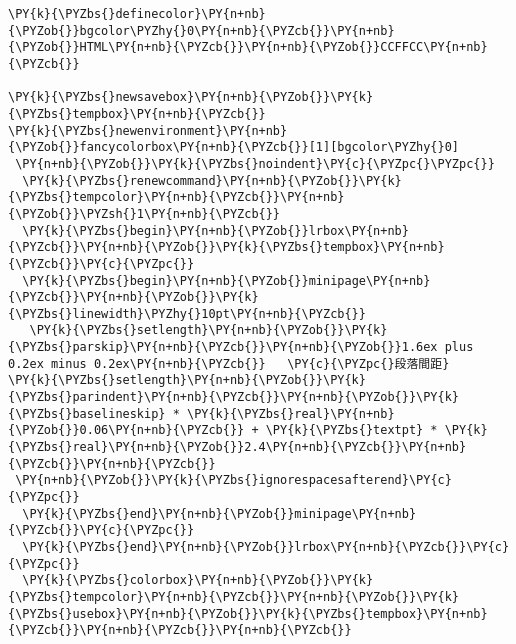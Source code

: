 \begin{Verbatim}[commandchars=\\\{\}]
\PY{k}{\PYZbs{}definecolor}\PY{n+nb}{\PYZob{}}bgcolor\PYZhy{}0\PY{n+nb}{\PYZcb{}}\PY{n+nb}{\PYZob{}}HTML\PY{n+nb}{\PYZcb{}}\PY{n+nb}{\PYZob{}}CCFFCC\PY{n+nb}{\PYZcb{}}

\PY{k}{\PYZbs{}newsavebox}\PY{n+nb}{\PYZob{}}\PY{k}{\PYZbs{}tempbox}\PY{n+nb}{\PYZcb{}}
\PY{k}{\PYZbs{}newenvironment}\PY{n+nb}{\PYZob{}}fancycolorbox\PY{n+nb}{\PYZcb{}}[1][bgcolor\PYZhy{}0]
 \PY{n+nb}{\PYZob{}}\PY{k}{\PYZbs{}noindent}\PY{c}{\PYZpc{}\PYZpc{}}
  \PY{k}{\PYZbs{}renewcommand}\PY{n+nb}{\PYZob{}}\PY{k}{\PYZbs{}tempcolor}\PY{n+nb}{\PYZcb{}}\PY{n+nb}{\PYZob{}}\PYZsh{}1\PY{n+nb}{\PYZcb{}}
  \PY{k}{\PYZbs{}begin}\PY{n+nb}{\PYZob{}}lrbox\PY{n+nb}{\PYZcb{}}\PY{n+nb}{\PYZob{}}\PY{k}{\PYZbs{}tempbox}\PY{n+nb}{\PYZcb{}}\PY{c}{\PYZpc{}}
  \PY{k}{\PYZbs{}begin}\PY{n+nb}{\PYZob{}}minipage\PY{n+nb}{\PYZcb{}}\PY{n+nb}{\PYZob{}}\PY{k}{\PYZbs{}linewidth}\PYZhy{}10pt\PY{n+nb}{\PYZcb{}}
   \PY{k}{\PYZbs{}setlength}\PY{n+nb}{\PYZob{}}\PY{k}{\PYZbs{}parskip}\PY{n+nb}{\PYZcb{}}\PY{n+nb}{\PYZob{}}1.6ex plus 0.2ex minus 0.2ex\PY{n+nb}{\PYZcb{}}   \PY{c}{\PYZpc{}段落間距}
\PY{k}{\PYZbs{}setlength}\PY{n+nb}{\PYZob{}}\PY{k}{\PYZbs{}parindent}\PY{n+nb}{\PYZcb{}}\PY{n+nb}{\PYZob{}}\PY{k}{\PYZbs{}baselineskip} * \PY{k}{\PYZbs{}real}\PY{n+nb}{\PYZob{}}0.06\PY{n+nb}{\PYZcb{}} + \PY{k}{\PYZbs{}textpt} * \PY{k}{\PYZbs{}real}\PY{n+nb}{\PYZob{}}2.4\PY{n+nb}{\PYZcb{}}\PY{n+nb}{\PYZcb{}}\PY{n+nb}{\PYZcb{}}
 \PY{n+nb}{\PYZob{}}\PY{k}{\PYZbs{}ignorespacesafterend}\PY{c}{\PYZpc{}}
  \PY{k}{\PYZbs{}end}\PY{n+nb}{\PYZob{}}minipage\PY{n+nb}{\PYZcb{}}\PY{c}{\PYZpc{}}
  \PY{k}{\PYZbs{}end}\PY{n+nb}{\PYZob{}}lrbox\PY{n+nb}{\PYZcb{}}\PY{c}{\PYZpc{}}
  \PY{k}{\PYZbs{}colorbox}\PY{n+nb}{\PYZob{}}\PY{k}{\PYZbs{}tempcolor}\PY{n+nb}{\PYZcb{}}\PY{n+nb}{\PYZob{}}\PY{k}{\PYZbs{}usebox}\PY{n+nb}{\PYZob{}}\PY{k}{\PYZbs{}tempbox}\PY{n+nb}{\PYZcb{}}\PY{n+nb}{\PYZcb{}}\PY{n+nb}{\PYZcb{}}
\end{Verbatim}
